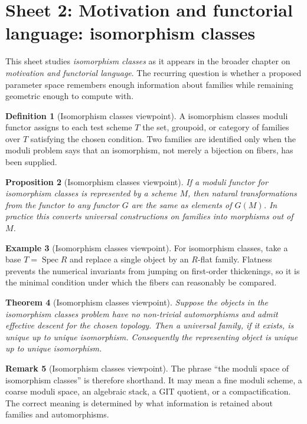 \documentclass[11pt]{amsart}
\newtheorem{theorem}{Theorem}[section]
\newtheorem{proposition}[theorem]{Proposition}
\theoremstyle{definition}
\newtheorem{definition}[theorem]{Definition}
\newtheorem{example}[theorem]{Example}
\newtheorem{remark}[theorem]{Remark}
\newcommand{\Spec}{\operatorname{Spec}}
\begin{document}
\section{Sheet 2: Motivation and functorial language: isomorphism classes}
This sheet studies \emph{isomorphism classes} as it appears in the broader chapter on \emph{motivation and functorial language}.  The recurring question is whether a proposed parameter space remembers enough information about families while remaining geometric enough to compute with.
\begin{definition}[Isomorphism classes viewpoint]
A isomorphism classes moduli functor assigns to each test scheme $T$ the set, groupoid, or category of families over $T$ satisfying the chosen condition.  Two families are identified only when the moduli problem says that an isomorphism, not merely a bijection on fibers, has been supplied.
\end{definition}
\begin{proposition}[Isomorphism classes viewpoint]
If a moduli functor for isomorphism classes is represented by a scheme $M$, then natural transformations from the functor to any functor $G$ are the same as elements of $G(M)$.  In practice this converts universal constructions on families into morphisms out of $M$.
\end{proposition}
\begin{example}[Isomorphism classes viewpoint]
For isomorphism classes, take a base $T=\Spec R$ and replace a single object by an $R$-flat family.  Flatness prevents the numerical invariants from jumping on first-order thickenings, so it is the minimal condition under which the fibers can reasonably be compared.
\end{example}
\begin{theorem}[Isomorphism classes viewpoint]
Suppose the objects in the isomorphism classes problem have no non-trivial automorphisms and admit effective descent for the chosen topology.  Then a universal family, if it exists, is unique up to unique isomorphism.  Consequently the representing object is unique up to unique isomorphism.
\end{theorem}
\begin{remark}[Isomorphism classes viewpoint]
The phrase ``the moduli space of isomorphism classes'' is therefore shorthand.  It may mean a fine moduli scheme, a coarse moduli space, an algebraic stack, a GIT quotient, or a compactification.  The correct meaning is determined by what information is retained about families and automorphisms.
\end{remark}
\end{document}
